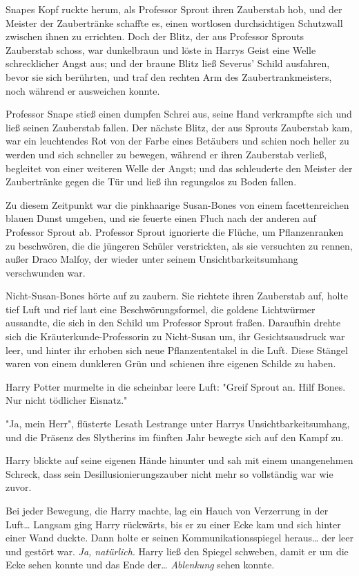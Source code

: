 {Snapes Kopf ruckte herum, als Professor Sprout ihren Zauberstab hob, und der Meister der Zaubertränke schaffte es, einen wortlosen durchsichtigen Schutzwall zwischen ihnen zu errichten. Doch der Blitz, der aus Professor Sprouts Zauberstab schoss, war dunkelbraun und löste in Harrys Geist eine Welle schrecklicher Angst aus; und der braune Blitz ließ Severus' Schild ausfahren, bevor sie sich berührten, und traf den rechten Arm des Zaubertrankmeisters, noch während er ausweichen konnte.

Professor Snape stieß einen dumpfen Schrei aus, seine Hand verkrampfte sich und ließ seinen Zauberstab fallen. Der nächste Blitz, der aus Sprouts Zauberstab kam, war ein leuchtendes Rot von der Farbe eines Betäubers und schien noch heller zu werden und sich schneller zu bewegen, während er ihren Zauberstab verließ, begleitet von einer weiteren Welle der Angst; und das schleuderte den Meister der Zaubertränke gegen die Tür und ließ ihn regungslos zu Boden fallen.

Zu diesem Zeitpunkt war die pinkhaarige Susan-Bones von einem facettenreichen blauen Dunst umgeben, und sie feuerte einen Fluch nach der anderen auf Professor Sprout ab. Professor Sprout ignorierte die Flüche, um Pflanzenranken zu beschwören, die die jüngeren Schüler verstrickten, als sie versuchten zu rennen, außer Draco Malfoy, der wieder unter seinem Unsichtbarkeitsumhang verschwunden war.

Nicht-Susan-Bones hörte auf zu zaubern. Sie richtete ihren Zauberstab auf, holte tief Luft und rief laut eine Beschwörungsformel, die goldene Lichtwürmer aussandte, die sich in den Schild um Professor Sprout fraßen. Daraufhin drehte sich die Kräuterkunde-Professorin zu Nicht-Susan um, ihr Gesichtsausdruck war leer, und hinter ihr erhoben sich neue Pflanzententakel in die Luft. Diese Stängel waren von einem dunkleren Grün und schienen ihre eigenen Schilde zu haben.

Harry Potter murmelte in die scheinbar leere Luft: "Greif Sprout an. Hilf Bones. Nur nicht tödlicher Eisnatz."

"Ja, mein Herr", flüsterte Lesath Lestrange unter Harrys Unsichtbarkeitsumhang, und die Präsenz des Slytherins im fünften Jahr bewegte sich auf den Kampf zu.

Harry blickte auf seine eigenen Hände hinunter und sah mit einem unangenehmen Schreck, dass sein Desillusionierungszauber nicht mehr so vollständig war wie zuvor.

Bei jeder Bewegung, die Harry machte, lag ein Hauch von Verzerrung in der Luft… Langsam ging Harry rückwärts, bis er zu einer Ecke kam und sich hinter einer Wand duckte. Dann holte er seinen Kommunikationsspiegel heraus… der leer und gestört war. \emph{Ja, natürlich}. Harry ließ den Spiegel schweben, damit er um die Ecke sehen konnte und das Ende der… \emph{Ablenkung} sehen konnte.

}
